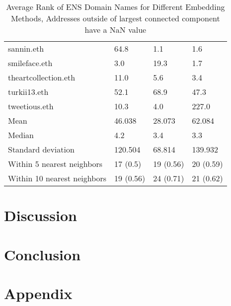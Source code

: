 \documentclass[12pt,a4paper,titlepage,oneside,english]{article}
\begin{document}
\begin{table}[h!]
\begin{tabular}{llll}
	sannin.eth & 64.8 & 1.1 & 1.6 \\
	smileface.eth & 3.0 & 19.3 & 1.7 \\
	theartcollection.eth & 11.0 & 5.6 & 3.4 \\
	turkii13.eth & 52.1 & 68.9 & 47.3 \\
	tweetious.eth & 10.3 & 4.0 & 227.0 \\
    \hline
    Mean & 46.038 & 28.073 & 62.084 \\
    Median & 4.2 & 3.4 & 3.3 \\
    Standard deviation & 120.504 & 68.814 &  139.932\\
    Within 5 nearest neighbors & 17 (0.5) & 19 (0.56) & 20 (0.59) \\
    Within 10 nearest neighbors & 19 (0.56) & 24 (0.71) & 21 (0.62)\\
    \hline
  \end{tabular}
  \caption{Average Rank of ENS Domain Names for Different Embedding Methods, Addresses outside of largest connected component have a NaN value}
  \label{tbl:ENS_Domain_Ranks}
\end{table}




\section{Discussion}




\section{Conclusion}




\newpage
\setcounter{page}{1}
\onehalfspacing
{}



\section{Appendix}
\end{document}
